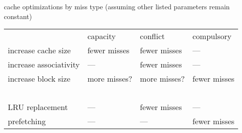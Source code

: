 \begin{frame}{cache optimizations by miss type}
\newcommand{\good}{\textcolor{green!50!black}{fewer misses}}
\newcommand{\bad}{\textcolor{red!50!black}{more misses}}
(assuming other listed parameters remain constant)
\begin{tabular}{llll}
    ~ & capacity & conflict & compulsory \\
increase cache size & \good & \good & --- \\
increase associativity & --- & \good & --- \\
increase block size & \bad? & \bad? & \good \\
~ \\
LRU replacement & --- & \good & --- \\
prefetching & --- & --- & \good \\
\end{tabular}
\end{frame}

